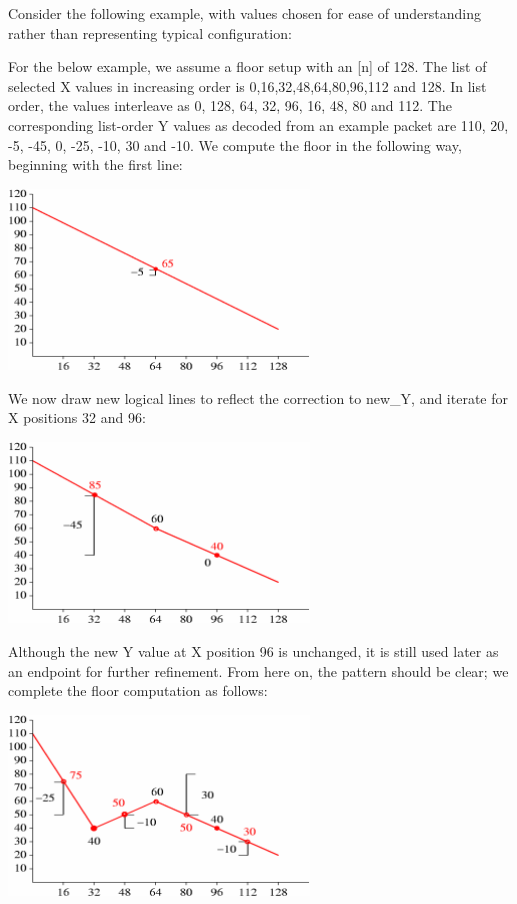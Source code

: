 Consider the following example, with values chosen for ease of
understanding rather than representing typical configuration:

For the below example, we assume a floor setup with an [n] of 128.
The list of selected X values in increasing order is
0,16,32,48,64,80,96,112 and 128.  In list order, the values interleave
as 0, 128, 64, 32, 96, 16, 48, 80 and 112.  The corresponding
list-order Y values as decoded from an example packet are 110, 20, -5,
-45, 0, -25, -10, 30 and -10.  We compute the floor in the following
way, beginning with the first line:

\begin{center}
\includegraphics[width=8cm]{floor1-1}
\end{center}

We now draw new logical lines to reflect the correction to new_Y, and
iterate for X positions 32 and 96:

\begin{center}
\includegraphics[width=8cm]{floor1-2}
\end{center}

Although the new Y value at X position 96 is unchanged, it is still
used later as an endpoint for further refinement.  From here on, the
pattern should be clear; we complete the floor computation as follows:

\begin{center}
\includegraphics[width=8cm]{floor1-3}
\end{center}

